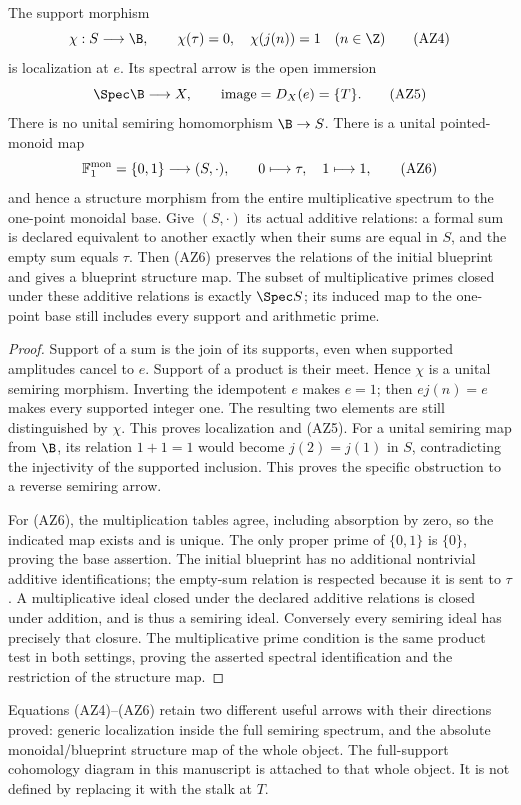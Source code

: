 \begin{proposition}
The support morphism
\[
 \chi:S\longrightarrow\B,\qquad \chi(\tau)=0,\quad\chi(j(n))=1
 \quad(n\in\Z)
 \tag{AZ4}
\]
is localization at $e$. Its spectral arrow is the open immersion
\[
 \Spec\B\longrightarrow X,
 \qquad\operatorname{image}=D_X(e)=\{T\}.
 \tag{AZ5}
\]
There is no unital semiring homomorphism $\B\to S$. There is a unital
pointed-monoid map
\[
 \mathbb F_1^{\rm mon}=\{0,1\}\longrightarrow (S,\cdot),
 \qquad0\longmapsto\tau,\quad1\longmapsto1,
 \tag{AZ6}
\]
and hence a structure morphism from the entire multiplicative spectrum to
the one-point monoidal base. Give $(S,\cdot)$ its actual additive relations:
a formal sum is declared equivalent to another exactly when their sums
are equal in $S$, and the empty sum equals $\tau$. Then (AZ6) preserves
the relations of the initial blueprint and gives a blueprint structure map.
The subset of multiplicative primes closed under these additive relations
is exactly $\Spec S$; its induced map to the one-point base still includes
every support and arithmetic prime.
\end{proposition}
\begin{proof}
Support of a sum is the join of its supports, even when supported amplitudes
cancel to $e$. Support of a product is their meet. Hence $\chi$ is a
unital semiring morphism. Inverting the idempotent $e$ makes $e=1$;
then $ej(n)=e$ makes every supported integer one. The resulting two elements
are still distinguished by $\chi$. This proves localization and (AZ5).
For a unital semiring map from $\B$, its relation $1+1=1$ would become
$j(2)=j(1)$ in $S$, contradicting the injectivity of the supported inclusion.
This proves the specific obstruction to a reverse semiring arrow.

For (AZ6), the multiplication tables agree, including absorption by zero,
so the indicated map exists and is unique. The only proper prime of
$\{0,1\}$ is $\{0\}$, proving the base assertion. The initial blueprint
has no additional nontrivial additive identifications; the empty-sum
relation is respected because it is sent to $\tau$. A multiplicative ideal
closed under the declared additive relations is closed under addition,
and is thus a semiring ideal. Conversely every semiring ideal has precisely
that closure. The multiplicative prime condition is the same product test
in both settings, proving the asserted spectral identification and the
restriction of the structure map.
\end{proof}

Equations (AZ4)--(AZ6) retain two different useful arrows with their
directions proved: generic localization inside the full semiring spectrum,
and the absolute monoidal/blueprint structure map of the whole object.
The full-support cohomology diagram in this manuscript is attached to that
whole object. It is not defined by replacing it with the stalk at $T$.
